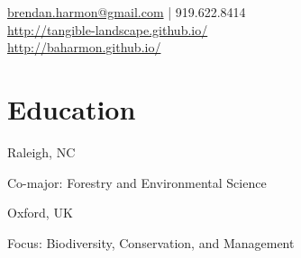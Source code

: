 \documentclass[]{baharmon_cv}
\begin{document}
%
%

%
%
{\vspace*{0.1cm} 
\href{mailto:brendan.harmon@gmail.com}{brendan.harmon@gmail.com} | 919.622.8414 \\
\url{http://tangible-landscape.github.io/} \\
\url{http://baharmon.github.io/}\\ 

}
%
%



%
%


\vspace*{0.2cm}
\section{Education} 
\begin{minipage}[t]{0.85\textwidth} 
\end{minipage}
\begin{minipage}[t]{0.15\textwidth} 
Raleigh, NC
\end{minipage}
Co-major: Forestry and Environmental Science
\vspace*{0.1cm}

\begin{minipage}[t]{0.85\textwidth} 
\end{minipage}
\begin{minipage}[t]{0.15\textwidth} 
Oxford, UK
\end{minipage}
Focus: Biodiversity, Conservation, and Management
\vspace*{0.1cm}
\end{document}
